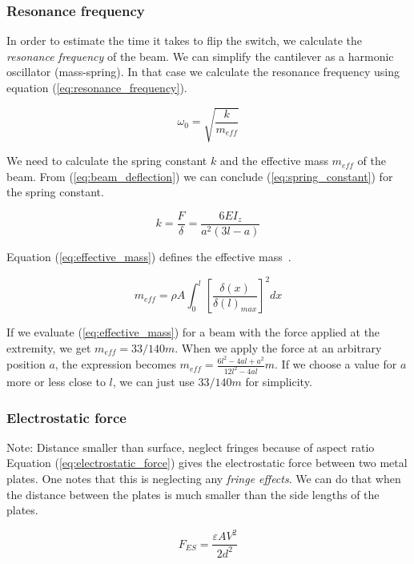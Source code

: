 \subsubsection{Resonance frequency}
In order to estimate the time it takes to flip the switch, we calculate the \emph{resonance frequency} of the beam.
We can simplify the cantilever as a harmonic oscillator (mass-spring).
In that case we calculate the resonance frequency using equation (\ref{eq:resonance_frequency}).

\begin{equation}
	\omega_0 = \sqrt{\frac{k}{m_{eff}}}
	\label{eq:resonance_frequency}
\end{equation}

We need to calculate the spring constant $k$ and the effective mass $m_{eff}$ of the beam.
From (\ref{eq:beam_deflection}) we can conclude (\ref{eq:spring_constant}) for the spring constant.

\begin{equation}
	k = \frac{F}{\delta} = \frac{6EI_z}{a^2(3l-a)}
	\label{eq:spring_constant}
\end{equation}

Equation (\ref{eq:effective_mass}) defines the effective mass~\cite{wong2011theoretical}.

\begin{equation}
	m_{eff} = \rho A \int_0^l{\left[\frac{\delta(x)}{\delta(l)_{max}}\right]^2dx}
	\label{eq:effective_mass}
\end{equation}

If we evaluate (\ref{eq:effective_mass}) for a beam with the force applied at the extremity, we get $m_{eff} = 33/140 m$.
When we apply the force at an arbitrary position $a$, the expression becomes $m_{eff} = \frac{6l^2-4al+a^2}{12l^2-4al} m$.
If we choose a value for $a$ more or less close to $l$, we can just use $33/140m$ for simplicity.


\subsubsection{Electrostatic force}
Note: Distance smaller than surface, neglect fringes because of aspect ratio
Equation (\ref{eq:electrostatic_force}) gives the electrostatic force between two metal plates.
One notes that this is neglecting any \emph{fringe effects}.
We can do that when the distance between the plates is much smaller than the side lengths of the plates.

\begin{equation}
	F_{ES} = \frac{\varepsilon AV^2}{2d^2}
	\label{eq:electrostatic_force}
\end{equation}

